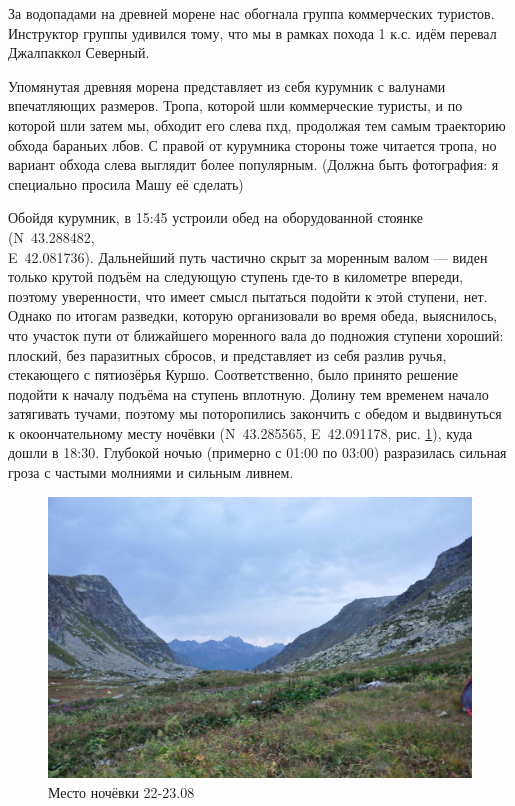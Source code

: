 За водопадами на древней морене нас обогнала группа коммерческих туристов. Инструктор группы удивился тому, что мы в рамках похода 1 к.с. идём перевал Джалпаккол Северный. 

Упомянутая древняя морена представляет из себя курумник с валунами впечатляющих размеров. Тропа, которой шли коммерческие туристы, и по которой шли затем мы, обходит его слева пхд, продолжая тем самым траекторию обхода бараньих лбов. С правой от курумника стороны тоже читается тропа, но вариант обхода слева выглядит более популярным. \alert{(Должна быть фотография: я специально просила Машу её сделать)}

Обойдя курумник, в 15:45 устроили обед на оборудованной стоянке (N~43.288482\degree,\\E~42.081736\degree). Дальнейший путь частично скрыт за моренным валом --- виден только крутой подъём на следующую ступень где-то в километре впереди, поэтому уверенности, что имеет смысл пытаться подойти к этой ступени, нет. Однако по итогам разведки, которую организовали во время обеда, выяснилось, что участок пути от ближайшего моренного вала до подножия ступени хороший: плоский, без паразитных сбросов, и представляет из себя разлив ручья, стекающего с пятиозёрья Куршо. Соответственно, было принято решение подойти к началу подъёма на ступень вплотную. Долину тем временем начало затягивать тучами, поэтому мы поторопились закончить с обедом и выдвинуться к окоончательному месту ночёвки (N~43.285565\degree, E~42.091178\degree, рис. \ref{fig:DSC_0018}), куда дошли в 18:30. Глубокой ночью (примерно с 01:00 по 03:00) разразилась сильная гроза с частыми молниями и сильным ливнем.

\begin{figure}[h!]
	\centering
	\includegraphics[width=0.7\linewidth]{../pics/DSC_0018}
	\caption{Место ночёвки 22-23.08}
	\label{fig:DSC_0018}
\end{figure}

\clearpage